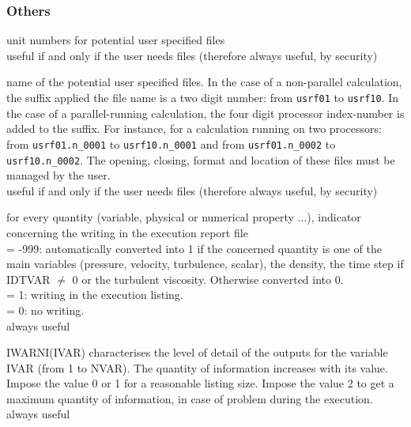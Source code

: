 \subsubsection{Others}

{unit numbers for potential user specified files\\
useful if and only if the user needs files (therefore always useful, by security)}

{name of the potential user specified files. In the case of a non-parallel
calculation, the suffix applied the file name is a two digit number:
from \texttt{usrf01} to \texttt{usrf10}. In the case of a
parallel-running calculation, the four digit processor index-number is
added to the suffix. For instance, for a calculation running on two
processors: from \texttt{usrf01.n\_0001} to \texttt{usrf10.n\_0001} and
from \texttt{usrf01.n\_0002} to \texttt{usrf10.n\_0002}. The opening,
closing, format and location of these files must be managed by the user.\\
useful if and only if the user needs files (therefore always useful, by security)}

{for every quantity (variable, physical or numerical property ...),
indicator concerning the writing in the execution report file \\
\hspace*{1.3cm}= -999: automatically converted into 1 if the concerned
quantity is one of the main variables (pressure, velocity, turbulence,
scalar), the density, the time step if IDTVAR $\ne$ 0 or the turbulent
viscosity. Otherwise converted into 0.\\ 
\hspace*{1.3cm}= 1: writing in the execution listing.\\
\hspace*{1.3cm}= 0: no writing.\\
always useful}

{IWARNI(IVAR) characterises the level of detail of the outputs for the
variable IVAR (from 1 to NVAR). The quantity of information increases with
its value.\\ 
Impose the value 0 or 1 for a reasonable listing size. Impose the value 2
to get a maximum quantity of information, in case of problem during the
execution.\\ 
always useful}

